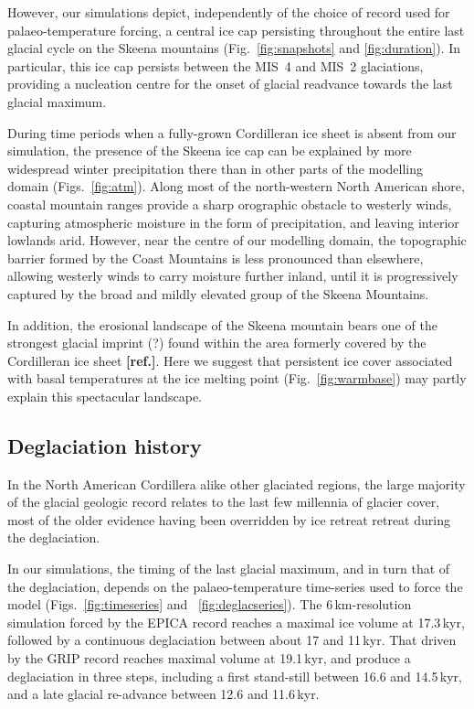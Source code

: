 \documentclass[tc, ms]{copernicus}
\newcommand{\aref}[0]{\textbf{[ref.]}}
\begin{document}
However, our simulations depict, independently of the choice of record used for
palaeo-temperature forcing, a central ice cap persisting throughout the entire
last glacial cycle on the Skeena mountains (Fig.~\ref{fig:snapshots} and
\ref{fig:duration}). In particular, this ice cap persists between the MIS~4
and MIS~2 glaciations, providing a nucleation centre for the onset of glacial
readvance towards the last glacial maximum.

During time periods when a fully-grown Cordilleran ice sheet is absent from our
simulation, the presence of the Skeena ice cap can be explained by more
widespread winter precipitation there than in other parts of the modelling
domain (Figs.~\ref{fig:atm}). Along most of the north-western North American
shore, coastal mountain ranges provide a sharp orographic obstacle to westerly
winds, capturing atmospheric moisture in the form of precipitation, and leaving
interior lowlands arid. However, near the centre of our modelling domain, the
topographic barrier formed by the Coast Mountains is less pronounced than
elsewhere, allowing westerly winds to carry moisture further inland, until it
is progressively captured by the broad and mildly elevated group of the Skeena
Mountains.

In addition, the erosional landscape of the Skeena mountain bears one of the
strongest glacial imprint (?) found within the area formerly covered by the
Cordilleran ice sheet \aref. Here we suggest that persistent ice cover
associated with basal temperatures at the ice melting point
(Fig.~\ref{fig:warmbase}) may partly explain this spectacular landscape.

\subsection{Deglaciation history}

In the North American Cordillera alike other glaciated regions, the large
majority of the glacial geologic record relates to the last few millennia of
glacier cover, most of the older evidence having been overridden by ice retreat
retreat during the deglaciation.

In our simulations, the timing of the last glacial maximum, and in turn that of
the deglaciation, depends on the palaeo-temperature time-series used to force
the model (Figs.~\ref{fig:timeseries} and ~\ref{fig:deglacseries}). The
6\,\unit{km}-resolution simulation forced by the EPICA record reaches a maximal
ice volume at 17.3\,\unit{kyr}, followed by a continuous deglaciation between
about 17 and 11\,\unit{kyr}. That driven by the GRIP record reaches maximal
volume at 19.1\,\unit{kyr}, and produce a deglaciation in three steps,
including a first stand-still between 16.6 and 14.5\,\unit{kyr}, and a late
glacial re-advance between 12.6 and 11.6\,\unit{kyr}.
\end{document}
